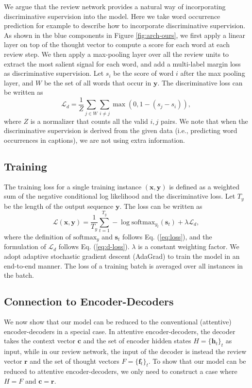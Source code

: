 \documentclass{article}
\begin{document}
We argue that the review network provides a natural way of incorporating discriminative supervision into the model. Here we take word occurrence prediction for example to describe how to incorporate discriminative supervision. As shown in the blue components in Figure \ref{fig:arch-ours}, we first apply a linear layer on top of the thought vector to compute a score for each word at each review step. We then apply a max-pooling layer over all the review units to extract the most salient signal for each word, and add a multi-label margin loss as discriminative supervision. Let $s_{i}$ be the score of word $i$ after the max pooling layer, and $W$ be the set of all words that occur in $\mathbf{y}$. The discriminative loss can be written as
\begin{equation}
\mathcal{L}_d = \frac{1}{Z} \sum_{j \in W} \sum_{i \not= j} \max(0, 1 - (s_j - s_i)),
\label{eq:d-loss}
\end{equation}
where $Z$ is a normalizer that counts all the valid $i, j$ pairs. We note that when the discriminative supervision is derived from the given data (i.e., predicting word occurrences in captions), we are not using extra information.

\subsection{Training}

The training loss for a single training instance $(\mathbf{x}, \mathbf{y})$ is defined as a weighted sum of the negative conditional log likelihood and the discriminative loss. Let $T_y$ be the length of the output sequence $\mathbf{y}$. The loss can be written as
\[
\mathcal{L}(\mathbf{x}, \mathbf{y}) = \frac{1}{T_y} \sum_{t = 1}^{T_y} - \log \mbox{softmax}_{y_t}(\mathbf{s}_t) + \lambda \mathcal{L}_d,
\]
where the definition of $\mbox{softmax}_y$ and $\mathbf{s}_t$ follows Eq. (\ref{eq:loss}), and the formulation of $\mathcal{L}_d$ follows Eq. (\ref{eq:d-loss}). $\lambda$ is a constant weighting factor. We adopt adaptive stochastic gradient descent (AdaGrad) \cite{duchi2011adaptive} to train the model in an end-to-end manner. The loss of a training batch is averaged over all instances in the batch.

\subsection{Connection to Encoder-Decoders}

We now show that our model can be reduced to the conventional (attentive) encoder-decoders in a special case. In attentive encoder-decoders, the decoder takes the context vector $\mathbf{c}$ and the set of encoder hidden states $H = \{\mathbf{h}_t\}_t$ as input, while in our review network, the input of the decoder is instead the review vector $\mathbf{r}$ and the set of thought vectors $F = \{\mathbf{f}_t\}_t$. To show that our model can be reduced to attentive encoder-decoders, we only need to construct a case where $H = F$ and $\mathbf{c} = \mathbf{r}$.
\end{document}
